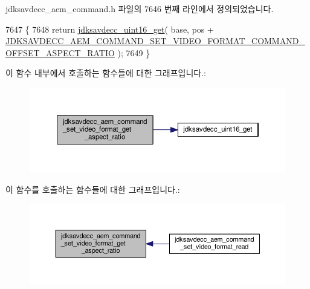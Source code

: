 jdksavdecc\+\_\+aem\+\_\+command.\+h 파일의 7646 번째 라인에서 정의되었습니다.


\begin{DoxyCode}
7647 \{
7648     \textcolor{keywordflow}{return} \hyperlink{group__endian_ga3fbbbc20be954aa61e039872965b0dc9}{jdksavdecc\_uint16\_get}( base, pos + 
      \hyperlink{group__command__set__video__format_gafa657d02dc13f6d54133c6bfe30b52fe}{JDKSAVDECC\_AEM\_COMMAND\_SET\_VIDEO\_FORMAT\_COMMAND\_OFFSET\_ASPECT\_RATIO}
       );
7649 \}
\end{DoxyCode}


이 함수 내부에서 호출하는 함수들에 대한 그래프입니다.\+:
\nopagebreak
\begin{figure}[H]
\begin{center}
\leavevmode
\includegraphics[width=350pt]{group__command__set__video__format_ga747c3dc808e77c1c21b3242387569d2b_cgraph}
\end{center}
\end{figure}




이 함수를 호출하는 함수들에 대한 그래프입니다.\+:
\nopagebreak
\begin{figure}[H]
\begin{center}
\leavevmode
\includegraphics[width=350pt]{group__command__set__video__format_ga747c3dc808e77c1c21b3242387569d2b_icgraph}
\end{center}
\end{figure}


